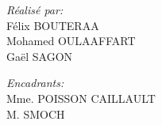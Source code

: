 \begin{titlepage}
\begin{sffamily}
\begin{center}
    \begin{minipage}{0.4\textwidth}
      \begin{flushleft} \large
\emph{Réalisé par:} \\
Félix \textsc{BOUTERAA} \\
Mohamed \textsc{OULAAFFART} \\
Gaël \textsc{SAGON}
   
        \emph{}
      \end{flushleft}
    \end{minipage}
    \begin{minipage}{0.4\textwidth}
      \begin{flushright} \large
        \emph{Encadrants:}\\
Mme. \textsc{POISSON CAILLAULT}\\
M. \textsc{SMOCH}

        \emph{}
      \end{flushright}
    \end{minipage}

    \vfill
  \end{center}
  \end{sffamily}
\end{titlepage}
